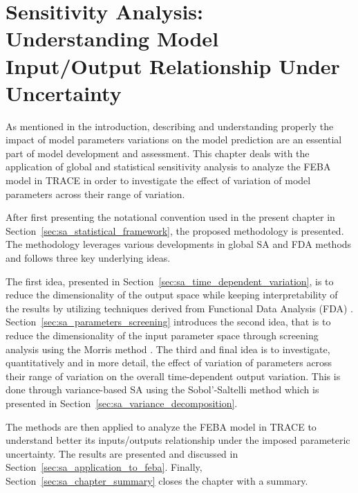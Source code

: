 \chapter[Sensitivity Analysis]{Sensitivity Analysis: Understanding Model Input/Output Relationship Under Uncertainty}\label{ch:sensitivity_analysis}

As mentioned in the introduction, describing and understanding properly the impact of model parameters variations on the model prediction are an essential part of model development and assessment. 
This chapter deals with the application of global and statistical sensitivity analysis to analyze the FEBA model in TRACE in order to investigate the effect of variation of model parameters across their range of variation.

After first presenting the notational convention used in the present chapter in Section~\ref{sec:sa_statistical_framework},
the proposed methodology is presented.
The methodology leverages various developments in global SA and FDA methods and follows three key underlying ideas.

The first idea, presented in Section~\ref{sec:sa_time_dependent_variation}, is to reduce the dimensionality of the output space while keeping interpretability of the results by utilizing techniques derived from Functional Data Analysis (FDA) \cite{Ramsay2005}.
Section~\ref{sec:sa_parameters_screening} introduces the second idea, that is to reduce the dimensionality of the input parameter space through screening analysis using the Morris method \cite{Morris1991,Campolongo2011}. 
The third and final idea is to investigate, quantitatively and in more detail, the effect of variation of parameters across their range of variation on the overall time-dependent output variation. 
This is done through variance-based SA using the Sobol’-Saltelli
method \cite{Sobol2001, Saltelli2002} which is presented in Section~\ref{sec:sa_variance_decomposition}.

The methods are then applied to analyze the FEBA model in TRACE to understand better its inputs/outputs relationship under the imposed parameteric uncertainty.
The results are presented and discussed in Section~\ref{sec:sa_application_to_feba}.
Finally, Section~\ref{sec:sa_chapter_summary} closes the chapter with a summary.









